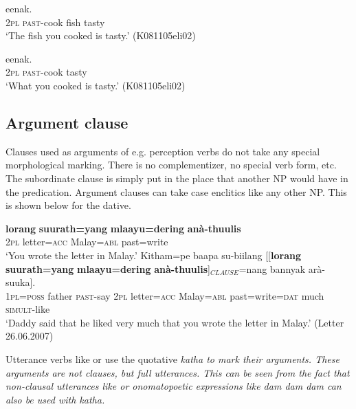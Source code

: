\ea\label{ex:hrelc:relc}
 eenak. \\
     2\textsc{pl} \textsc{past}-cook fish tasty  \\
    `The fish you cooked is tasty.'  (K081105eli02)
\z
 
\ea\label{ex:hrelc:hrelc}
 eenak. \\
     2\textsc{pl} \textsc{past}-cook { } tasty  \\
    `What you cooked is tasty.'  (K081105eli02)
\z

\subsection{Argument clause}
Clauses used as arguments of e.g. perception verbs do not take any special morphological marking. There is no complementizer, no special verb form, etc. The subordinate clause is simply put in the place that another NP would have in the predication. Argument clauses can take case enclitics like any other NP. This is shown below for the dative.


\ea\label{ex:clauses:arg:main}
    \ea
	\gll \textbf{lorang} \textbf{suurath=yang} \textbf{mlaayu=dering} \textbf{anà-thuulis}\\ %
	2\textsc{pl} letter=\textsc{acc} Malay=\textsc{abl} past=write \\
	    `You wrote the letter in Malay.'   
    \ex
	\gll Kitham=pe baapa su-biilang [[\textbf{lorang} \textbf{suurath=yang} \textbf{mlaayu=dering} \textbf{anà-thuulis}]$_{CLAUSE}$=nang bannyak arà-suuka]. \\ %
	    1\textsc{pl}=\textsc{poss} father \textsc{past}-say 2\textsc{pl} letter=\textsc{acc} Malay=\textsc{abl} past=write=\textsc{dat} much \textsc{simult}-like \\
	    `Daddy said that he liked very much that you wrote the letter in Malay.'  (Letter 26.06.2007)
    \z
\z

 

% 

Utterance verbs like  or  use the quotative \em katha \em to mark their arguments. These arguments are not clauses, but full utterances. This can be seen from the fact that non-clausal utterances like  or onomatopoetic expressions like \em dam dam dam \em can also be used with \em katha\em.


